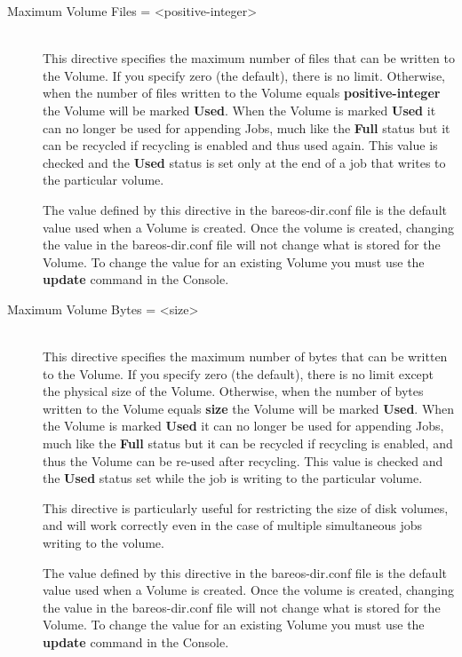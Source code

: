 \begin{description}
\item [Maximum Volume Files = {\textless}positive-integer{\textgreater}] \hfill \\
This directive specifies the maximum number of files that can be written
to the Volume.  If you specify zero (the default), there is no limit.
Otherwise, when the number of files written to the Volume equals {\bf
positive-integer} the Volume will be marked {\bf Used}.  When the Volume
is marked {\bf Used} it can no longer be used for appending Jobs, much
like the {\bf Full} status but it can be recycled if recycling is
enabled and thus used again.  This value is checked and the {\bf Used}
status is set only at the end of a job that writes to the particular
volume.

The value defined by this directive in the bareos-dir.conf file is the
default value used when a Volume is created.  Once the volume is
created, changing the value in the bareos-dir.conf file will not change
what is stored for the Volume.  To change the value for an existing
Volume you must use the {\bf update} command in the Console.

\item [Maximum Volume Bytes = {\textless}size{\textgreater}] \hfill \\
This directive specifies the maximum number of bytes that can be written
to the Volume.  If you specify zero (the default), there is no limit
except the physical size of the Volume.  Otherwise, when the number of
bytes written to the Volume equals {\bf size} the Volume will be marked
{\bf Used}.  When the Volume is marked {\bf Used} it can no longer be
used for appending Jobs, much like the {\bf Full} status but it can be
recycled if recycling is enabled, and thus the Volume can be re-used
after recycling.  This value is checked and the {\bf Used} status set
while the job is writing to the particular volume.

This directive is particularly useful for restricting the size
of disk volumes, and will work correctly even in the case of
multiple simultaneous jobs writing to the volume.

The value defined by this directive in the bareos-dir.conf file is the
default value used when a Volume is created.  Once the volume is
created, changing the value in the bareos-dir.conf file will not change
what is stored for the Volume.  To change the value for an existing
Volume you must use the {\bf update} command in the Console.


\end{description}
